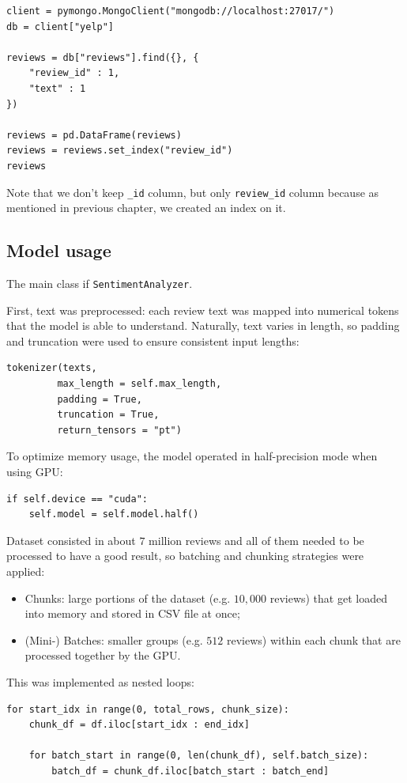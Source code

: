 \documentclass{Configuration_Files/PoliMi3i_thesis}
\begin{document}
\bigskip

\begin{verbatim}
client = pymongo.MongoClient("mongodb://localhost:27017/")
db = client["yelp"]

reviews = db["reviews"].find({}, {
    "review_id" : 1,
    "text" : 1
})

reviews = pd.DataFrame(reviews)
reviews = reviews.set_index("review_id")
reviews
\end{verbatim}

\bigskip

Note that we don't keep \texttt{\_id} column, but only \texttt{review\_id} column because as mentioned in previous chapter, we created an index on it.  

\subsection{Model usage}
The main class if \texttt{SentimentAnalyzer}.

First, text was preprocessed: each review text was mapped into numerical tokens that the model is able to understand. Naturally, text varies in length, so padding and truncation were used to ensure consistent input lengths:

\begin{verbatim}
tokenizer(texts, 
         max_length = self.max_length, 
         padding = True, 
         truncation = True, 
         return_tensors = "pt")
\end{verbatim}

To optimize memory usage, the model operated in half-precision mode when using GPU:
\begin{verbatim}
if self.device == "cuda":
    self.model = self.model.half()
\end{verbatim}

Dataset consisted in about $7$ million reviews and all of them needed to be processed to have a good result, so batching and chunking strategies were applied:
\begin{itemize}
    \item Chunks: large portions of the dataset (e.g. $10,000$ reviews) that get loaded into memory and stored in CSV file at once;
    \item (Mini-) Batches: smaller groups (e.g. $512$ reviews) within each chunk that are processed together by the GPU.
\end{itemize}

This was implemented as nested loops:
\begin{verbatim}
for start_idx in range(0, total_rows, chunk_size):
    chunk_df = df.iloc[start_idx : end_idx]
    
    for batch_start in range(0, len(chunk_df), self.batch_size):
        batch_df = chunk_df.iloc[batch_start : batch_end]
\end{verbatim}
\end{document}
